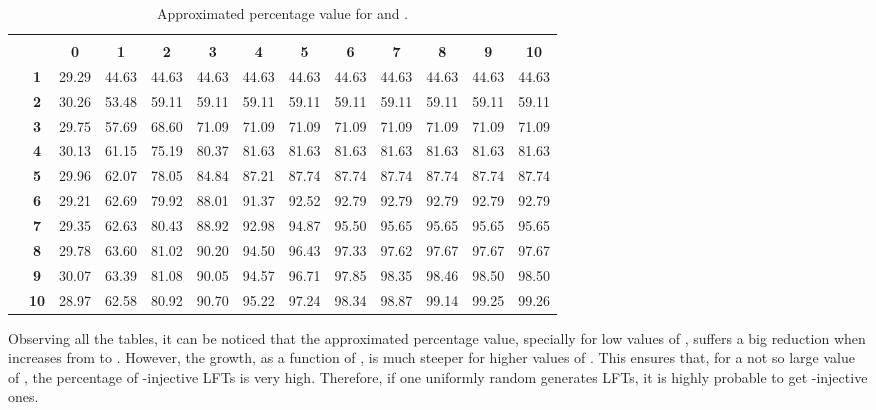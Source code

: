 \documentclass{ocg}
\newcommand{\LFT}{LFT}
\begin{document}
\begin{table}[h]
  \centering\scriptsize
  \begin{tabular}{|c|c|c|c|c|c|c|c|c|c|c|c|c|}\cline{3-13}
    \multicolumn{1}{c}{}&\multicolumn{1}{c}{} & \multicolumn{11}{|c|}{\footnotesize }\\
    \cline{3-13} 
    \multicolumn{2}{c|}{}&\bf 0&\bf1&\bf2&\bf3&\bf4&\bf5&\bf6&\bf7&\bf8&\bf9&\bf10\\\hline
    \multirow{10}{*}{\footnotesize }& \bf 1
&29.29&44.63&44.63&44.63&44.63&44.63&44.63&44.63&44.63&44.63&44.63\\    \cline{2-13}
&\bf 2&30.26&53.48&59.11&59.11&59.11&59.11&59.11&59.11&59.11&59.11&59.11\\    \cline{2-13}
&\bf 3&29.75&57.69&68.60&71.09&71.09&71.09&71.09&71.09&71.09&71.09&71.09\\    \cline{2-13}
&\bf 4&30.13&61.15&75.19&80.37&81.63&81.63&81.63&81.63&81.63&81.63&81.63\\    \cline{2-13}
&\bf 5&29.96&62.07&78.05&84.84&87.21&87.74&87.74&87.74&87.74&87.74&87.74\\    \cline{2-13}
&\bf 6&29.21&62.69&79.92&88.01&91.37&92.52&92.79&92.79&92.79&92.79&92.79\\    \cline{2-13}
&\bf 7&29.35&62.63&80.43&88.92&92.98&94.87&95.50&95.65&95.65&95.65&95.65\\    \cline{2-13}
&\bf 8&29.78&63.60&81.02&90.20&94.50&96.43&97.33&97.62&97.67&97.67&97.67\\    \cline{2-13}
&\bf 9&30.07&63.39&81.08&90.05&94.57&96.71&97.85&98.35&98.46&98.50&98.50\\    \cline{2-13}
&\bf 10&28.97&62.58&80.92&90.70&95.22&97.24&98.34&98.87&99.14&99.25&99.26\\    
\hline
  \end{tabular}
  \caption{Approximated percentage value for  and .}
  \label{table55x}
\end{table}

Observing all the tables, it can be noticed that the approximated
percentage value, specially for low values of , suffers a big
reduction when  increases from  to . However, the
growth, as a function of , is much steeper for higher values of
. This ensures that, for a not so large value of , the
percentage of -injective \LFT{}s is very high. Therefore, if
one uniformly random generates \LFT{}s, it is highly probable to get -injective ones.
 
\end{document}
